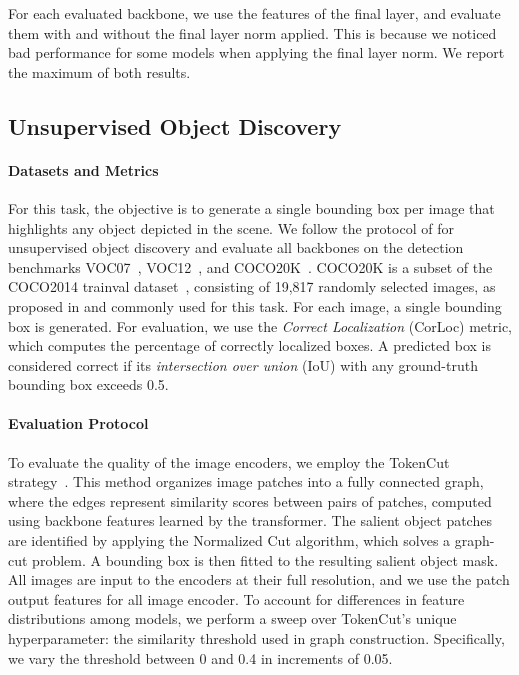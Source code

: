 For each evaluated backbone, we use the features of the final layer, and evaluate them with and without the final layer norm applied. 
This is because we noticed bad performance for some models when applying the final layer norm.
We report the maximum of both results.

\subsection{Unsupervised Object Discovery}
\label{app:exp-details:object-discovery}

\paragraph{Datasets and Metrics}
For this task, the objective is to generate a single bounding box per image that highlights any object depicted in the scene. We follow the protocol of \citet{simeoni2021localizing} for unsupervised object discovery and evaluate all backbones on the detection benchmarks VOC07~\citep{pascal-voc-2007}, VOC12~\citep{pascal-voc-2012}, and COCO20K~\citep{Lin2014cocodataset,Vo20rOSD}. COCO20K is a subset of the COCO2014 trainval dataset~\citep{Lin2014cocodataset}, consisting of 19,817 randomly selected images, as proposed in \citep{Vo20rOSD} and commonly used for this task. For each image, a single bounding box is generated. For evaluation, we use the \textit{Correct Localization} (CorLoc) metric, which computes the percentage of correctly localized boxes. A predicted box is considered correct if its \textit{intersection over union} (IoU) with any ground-truth bounding box exceeds 0.5.

\paragraph{Evaluation Protocol}
To evaluate the quality of the image encoders, we employ the TokenCut strategy~\citep{wang2023tokencut}. This method organizes image patches into a fully connected graph, where the edges represent similarity scores between pairs of patches, computed using backbone features learned by the transformer. The salient object patches are identified by applying the Normalized Cut algorithm, which solves a graph-cut problem. A bounding box is then fitted to the resulting salient object mask.
All images are input to the encoders at their full resolution, and we use the patch output features for all image encoder. To account for differences in feature distributions among models, we perform a sweep over TokenCut’s unique hyperparameter: the similarity threshold used in graph construction. Specifically, we vary the threshold between 0 and 0.4 in increments of 0.05.

